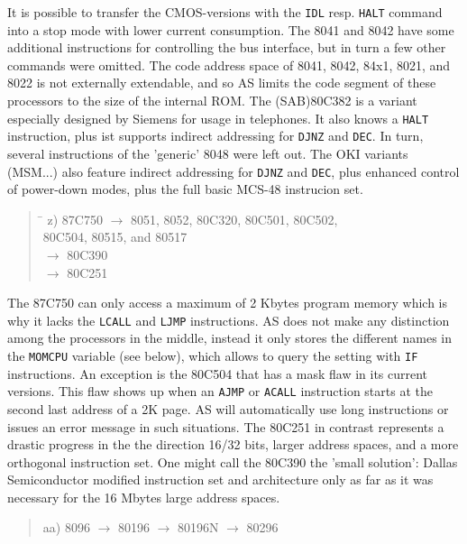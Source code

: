 \documentclass[12pt,twoside]{report}
\newcommand{\tty}[1]{{\tt #1}}
\begin{document}
It is possible to transfer the CMOS-versions with the \tty{IDL} resp.
\tty{HALT} command into a stop mode with lower current consumption.
The 8041 and 8042 have some additional instructions for controlling the
bus interface, but in turn a few other commands were omitted.
The code address space of 8041, 8042, 84x1, 8021, and 8022 is not externally
extendable, and so AS limits the code segment of these processors to
the size of the internal ROM.  The (SAB)80C382 is a variant especially
designed by Siemens for usage in telephones.  It also knows a
\tty{HALT} instruction, plus ist supports indirect addressing for
\tty{DJNZ} and \tty{DEC}.  In turn, several instructions of the
'generic' 8048 were left out.  The OKI variants (MSM...) also
feature indirect addressing for \tty{DJNZ} and \tty{DEC}, plus
enhanced control of power-down modes, plus the full basic MCS-48
instrucion set.
\begin{quote}
\begin{tabbing}
\hspace{0.7cm} \= \kill
z) \> 87C750 $\rightarrow$ 8051, 8052, 80C320, 80C501, 80C502, \\
   \> 80C504, 80515, and 80517 \\
   \> $\rightarrow$ 80C390 \\
   \> $\rightarrow$ 80C251
\end{tabbing}
\end{quote}
The 87C750 can only access a maximum of 2 Kbytes program memory which is
why it lacks the \tty{LCALL} and \tty{LJMP} instructions.  AS does not
make any distinction among the processors in the middle, instead it only
stores the different names in the \tty{MOMCPU} variable (see below), which
allows to query the setting with \tty{IF} instructions.  An exception is
the 80C504 that has a mask flaw in its current versions.  This flaw shows
up when an \tty{AJMP} or \tty{ACALL} instruction starts at the second last
address of a 2K page.  AS will automatically use long instructions or
issues an error message in such situations.  The 80C251 in contrast
represents a drastic progress in the the direction 16/32 bits, larger
address spaces, and a more orthogonal instruction set.  One might call the
80C390 the 'small solution': Dallas Semiconductor modified instruction set
and architecture only as far as it was necessary for the 16 Mbytes large
address spaces.
\begin{quote}
aa) 8096 $\rightarrow$ 80196 $\rightarrow$ 80196N $\rightarrow$ 80296
\end{quote}
\end{document}
